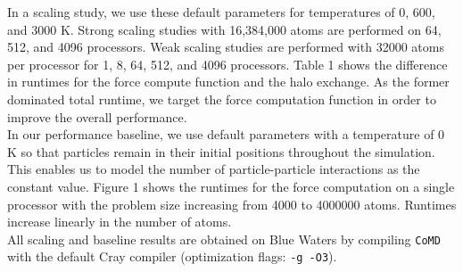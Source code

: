 \documentclass[12pt]{article}
\begin{document}
 In a scaling study, we use these default parameters for temperatures of 
0, 600, and 3000 K. Strong scaling studies with 16,384,000 atoms are
performed on 64, 512, and 4096 processors. Weak scaling studies are
performed with 32000 atoms per processor for 1, 8, 64, 512, and 4096 
processors. Table 1 shows the difference in runtimes for the force compute
function and the halo exchange. As the former dominated total runtime, 
we target the force computation function in order to improve the overall 
performance. \\

 In our performance baseline, we use default parameters with a temperature of 
0 K so that particles remain in their initial positions throughout the simulation.
This enables us to model the number of particle-particle interactions as the 
constant value. Figure 1 shows the runtimes for the force computation on 
a single processor with the problem size increasing from 4000 to 4000000 
atoms. Runtimes increase linearly in the number of atoms. \\

 All scaling and baseline results are obtained on Blue Waters by compiling 
\texttt{CoMD} with the default Cray compiler (optimization flags: \texttt{-g -O3}).
\end{document}
